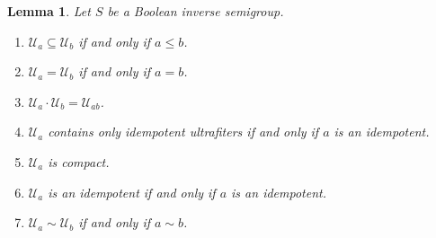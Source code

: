 \documentclass[a4paper]{amsart}
\newtheorem{lemma}[theorem]{Lemma}
\begin{document}
\begin{lemma}\label{lem:needed-for-later}
Let $S$ be a Boolean inverse semigroup.
\begin{enumerate}
\item $\mathscr{U}_{a} \subseteq \mathscr{U}_{b}$ if and only if $a \leq b$.
\item $\mathscr{U}_{a} = \mathscr{U}_{b}$ if and only if $a = b$.
\item $\mathscr{U}_{a} \cdot \mathscr{U}_{b} = \mathscr{U}_{ab}$.
\item $\mathscr{U}_{a}$ contains only idempotent ultrafiters if and only if $a$ is an idempotent.
\item $\mathscr{U}_{a}$ is compact.
\item $\mathscr{U}_{a}$ is an idempotent if and only if $a$ is an idempotent.
\item $\mathscr{U}_{a} \sim \mathscr{U}_{b}$ if and only if $a \sim b$.
\end{enumerate}
\end{lemma}
\end{document}
